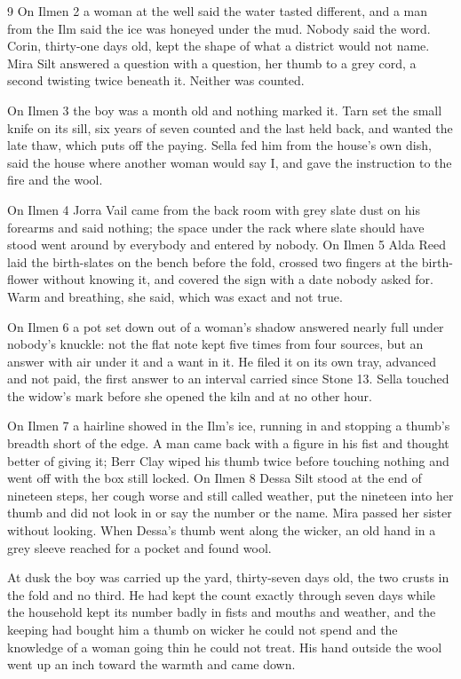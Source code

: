 \begin{CRchronicle}{9}
On Ilmen 2 a woman at the well said the water tasted different, and a man from the Ilm said the ice was honeyed under the mud. Nobody said the word. Corin, thirty-one days old, kept the shape of what a district would not name. Mira Silt answered a question with a question, her thumb to a grey cord, a second twisting twice beneath it. Neither was counted.

On Ilmen 3 the boy was a month old and nothing marked it. Tarn set the small knife on its sill, six years of seven counted and the last held back, and wanted the late thaw, which puts off the paying. Sella fed him from the house’s own dish, said the house where another woman would say I, and gave the instruction to the fire and the wool.

On Ilmen 4 Jorra Vail came from the back room with grey slate dust on his forearms and said nothing; the space under the rack where slate should have stood went around by everybody and entered by nobody. On Ilmen 5 Alda Reed laid the birth-slates on the bench before the fold, crossed two fingers at the birth-flower without knowing it, and covered the sign with a date nobody asked for. Warm and breathing, she said, which was exact and not true.

On Ilmen 6 a pot set down out of a woman’s shadow answered nearly full under nobody’s knuckle: not the flat note kept five times from four sources, but an answer with air under it and a want in it. He filed it on its own tray, advanced and not paid, the first answer to an interval carried since Stone 13. Sella touched the widow’s mark before she opened the kiln and at no other hour.

On Ilmen 7 a hairline showed in the Ilm’s ice, running in and stopping a thumb’s breadth short of the edge. A man came back with a figure in his fist and thought better of giving it; Berr Clay wiped his thumb twice before touching nothing and went off with the box still locked. On Ilmen 8 Dessa Silt stood at the end of nineteen steps, her cough worse and still called weather, put the nineteen into her thumb and did not look in or say the number or the name. Mira passed her sister without looking. When Dessa’s thumb went along the wicker, an old hand in a grey sleeve reached for a pocket and found wool.

At dusk the boy was carried up the yard, thirty-seven days old, the two crusts in the fold and no third. He had kept the count exactly through seven days while the household kept its number badly in fists and mouths and weather, and the keeping had bought him a thumb on wicker he could not spend and the knowledge of a woman going thin he could not treat. His hand outside the wool went up an inch toward the warmth and came down.
\end{CRchronicle}
